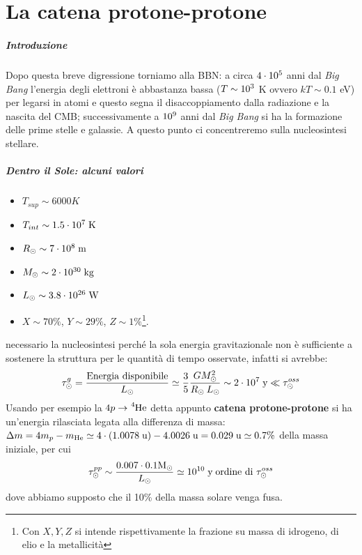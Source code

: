 \chapter{La catena protone-protone}\label{cap-pp}

\paragraph{Introduzione} Dopo questa breve digressione torniamo alla BBN: a circa $4\cdot10^{5}$ anni dal \textit{Big Bang} l'energia degli elettroni è abbastanza bassa ($T\sim10^{3}$ K ovvero $kT\sim0.1$ eV) per legarsi in atomi e questo segna il disaccoppiamento dalla radiazione e la nascita del CMB; successivamente a $10^{9}$ anni dal \textit{Big Bang} si ha la formazione delle prime stelle e galassie. A questo punto ci concentreremo sulla nucleosintesi stellare.

\paragraph{Dentro il Sole: alcuni valori}
\begin{itemize}
    \item $T_{sup}\sim 6000\unit{K}$
    \item $T_{int}\sim 1.5\cdot10^{7}\;\mbox{K}$
    \item $R_{\odot}\sim 7\cdot10^{8}\;\mbox{m}$
    \item $M_{\odot}\sim 2\cdot10^{30}\;\mbox{kg}$
    \item $L_{\odot}\sim 3.8\cdot10^{26}\;\mbox{W}$
    \item $X\sim 70\%$, $Y\sim 29\%$, $Z\sim 1\%$\footnote{Con $X,Y,Z$ si intende rispettivamente la frazione su massa di idrogeno, di elio e la metallicità}.
\end{itemize}
 necessario  la nucleosintesi perché la sola energia gravitazionale non è sufficiente a sostenere la struttura per le quantità di tempo osservate, infatti si avrebbe:
$$\tau_{\odot}^g = \frac{\text{Energia disponibile}}{L_{\odot}} \simeq \frac{3}{5}\frac{GM_{\odot}^2}{R_{\odot}\:L_{\odot} }\sim 2\cdot10^{7}\;\mbox{y}\ll\tau_{\odot}^{oss}$$
Usando per esempio la $4p\to\ce{^4He}$ detta appunto \textbf{catena protone-protone} si ha un'energia rilasciata legata alla differenza di massa: $\Delta m = 4m_p - m_{\ce{He}} \simeq 4\cdot(1.0078\unit{u})-4.0026\unit{u} = 0.029\unit{u}\simeq 0.7\%$ della massa iniziale, per cui
$$\tau_{\odot}^{pp}\sim\frac{0.007\cdot0.1\mbox{M}_{\odot}}{L_{\odot}}\simeq 10^{10}\;\mbox{y} \;\text{ordine di } \tau_{\odot}^{oss}$$
dove abbiamo supposto che il 10\% della massa solare venga fusa.

